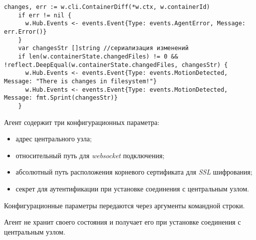 \begin{lstlisting}[style=gostyle]
	changes, err := w.cli.ContainerDiff(*w.ctx, w.containerId)
	if err != nil {
	  w.Hub.Events <- events.Event{Type: events.AgentError, Message: err.Error()}
	}
	var changesStr []string //сериализация изменений
	if len(w.containerState.changedFiles) != 0 && !reflect.DeepEqual(w.containerState.changedFiles, changesStr) {
	  w.Hub.Events <- events.Event{Type: events.MotionDetected, Message: "There is changes in filesystem!"}
	  w.Hub.Events <- events.Event{Type: events.MotionDetected, Message: fmt.Sprint(changesStr)}
	}
\end{lstlisting}

Агент содержит три конфигурационных параметра:
\begin{itemize}
	\item адрес центрального узла;
	\item относительный путь для \textit{websocket} подключения;
	\item абсолютный путь расположения корневого сертификата для \textit{SSL} шифрования;
	\item секрет для аутентификации при установке соединения с центральным узлом.
\end{itemize}

Конфигурационные параметры передаются через аргументы командной строки.

Агент не хранит своего состояния и получает его при установке соединения с центральным узлом.